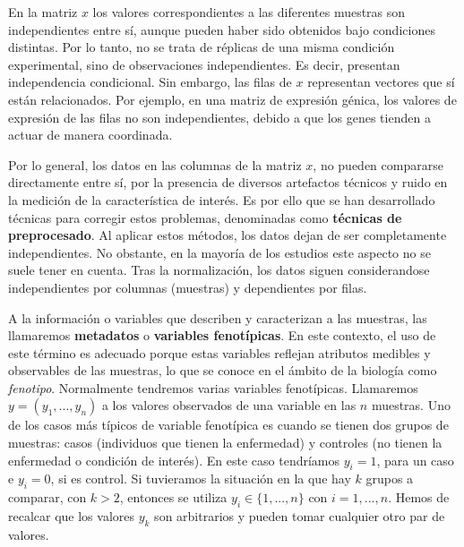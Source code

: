En la matriz $x$ los valores correspondientes a las diferentes muestras son independientes entre sí, aunque pueden
haber sido obtenidos bajo condiciones distintas. Por lo tanto, no se trata de réplicas de una misma condición
experimental, sino de observaciones independientes. Es decir, presentan independencia condicional. Sin embargo, las
filas de $x$ representan vectores que sí están relacionados. Por ejemplo, en una matriz de expresión génica, los 
valores de expresión de las filas no son independientes, debido a que los genes tienden a actuar de manera coordinada. \newline

Por lo general, los datos en las columnas de la matriz $x$, no pueden compararse directamente entre sí, por la presencia
de diversos artefactos técnicos y ruido en la medición de la característica de interés. Es por ello que se han desarrollado
técnicas para corregir estos problemas, denominadas como \textbf{técnicas de preprocesado}. Al aplicar estos métodos, los
datos dejan de ser completamente independientes. No obstante, en la mayoría de los estudios este aspecto no se suele
tener en cuenta. Tras la normalización, los datos siguen considerandose independientes por columnas (muestras) y dependientes
por filas. \newline

A la información o variables que describen y caracterizan a las muestras, las llamaremos \textbf{metadatos} o 
\textbf{variables fenotípicas}. En este contexto, el uso de este término es adecuado porque estas variables reflejan
atributos medibles y observables de las muestras, lo que se conoce en el ámbito de la biología como \textit{fenotipo}. 
Normalmente tendremos varias variables fenotípicas. 
Llamaremos $y = (y_{1},...,y_{n})$ a los valores observados de una variable en las $n$ muestras. Uno de los casos más típicos
de variable fenotípica es cuando se tienen dos grupos de muestras: casos (individuos que tienen la enfermedad) y controles
(no tienen la enfermedad o condición de interés). En este caso tendríamos $y_{i} = 1$, para un caso e $y_{i} = 0$, si es control.
Si tuvieramos la situación en la que hay $k$ grupos a comparar, con $k > 2$, entonces se utiliza $y_{i} \in \{1,...,n\}$ 
con $i = 1,...,n$. Hemos de recalcar que los valores $y_{k}$ son arbitrarios y pueden tomar cualquier otro par de valores. \newline




